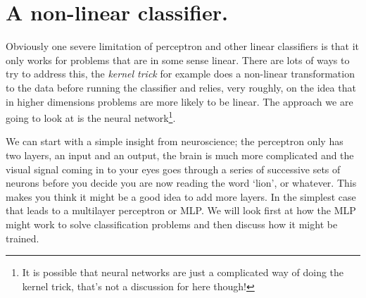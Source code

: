 \documentclass[12pt]{article}
\begin{document}
\section*{A non-linear classifier.} 

Obviously one severe limitation of perceptron and other linear
classifiers is that it only works for problems that are in some sense
linear. There are lots of ways to try to address this, the
\textsl{kernel trick} for example does a non-linear transformation to
the data before running the classifier and relies, very roughly, on
the idea that in higher dimensions problems are more likely to be
linear. The approach we are going to look at is the neural
network\footnote{It is possible that neural networks are just a
complicated way of doing the kernel trick, that's not a discussion for
here though!}.

We can start with a simple insight from neuroscience; the perceptron
only has two layers, an input and an output, the brain is much more
complicated and the visual signal coming in to your eyes goes through
a series of successive sets of neurons before you decide you are now
reading the word `lion', or whatever. This makes you think it might be
a good idea to add more layers. In the simplest case that leads to a
multilayer perceptron or MLP. We will look first at how the MLP might
work to solve classification problems and then discuss how it might be
trained.
\end{document}
